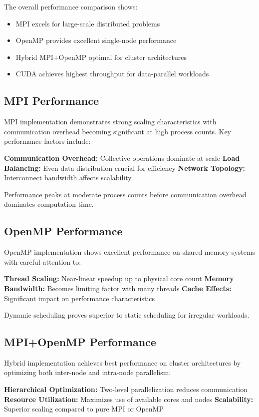 \documentclass[10pt,a4paper,twocolumn]{article}
\begin{document}
The overall performance comparison shows:
\begin{itemize}
\item MPI excels for large-scale distributed problems
\item OpenMP provides excellent single-node performance
\item Hybrid MPI+OpenMP optimal for cluster architectures
\item CUDA achieves highest throughput for data-parallel workloads
\end{itemize}

\subsection{MPI Performance}

MPI implementation demonstrates strong scaling characteristics with communication overhead becoming significant at high process counts. Key performance factors include:

\textbf{Communication Overhead:} Collective operations dominate at scale
\textbf{Load Balancing:} Even data distribution crucial for efficiency
\textbf{Network Topology:} Interconnect bandwidth affects scalability

Performance peaks at moderate process counts before communication overhead dominates computation time.

\subsection{OpenMP Performance}

OpenMP implementation shows excellent performance on shared memory systems with careful attention to:

\textbf{Thread Scaling:} Near-linear speedup up to physical core count
\textbf{Memory Bandwidth:} Becomes limiting factor with many threads
\textbf{Cache Effects:} Significant impact on performance characteristics

Dynamic scheduling proves superior to static scheduling for irregular workloads.

\subsection{MPI+OpenMP Performance}

Hybrid implementation achieves best performance on cluster architectures by optimizing both inter-node and intra-node parallelism:

\textbf{Hierarchical Optimization:} Two-level parallelization reduces communication
\textbf{Resource Utilization:} Maximizes use of available cores and nodes
\textbf{Scalability:} Superior scaling compared to pure MPI or OpenMP
\end{document}
